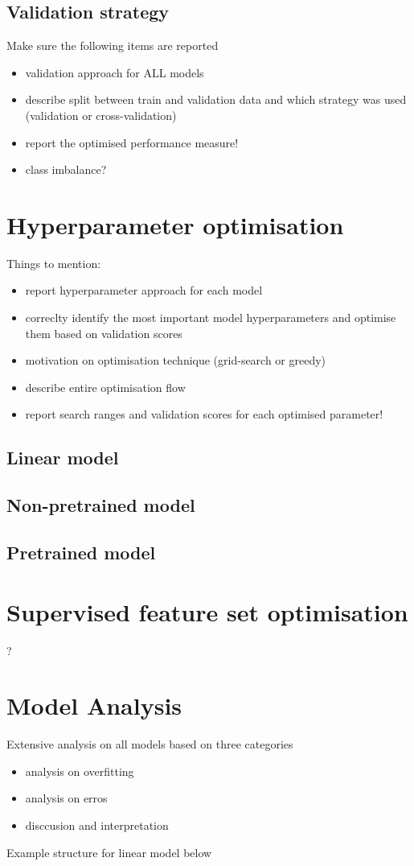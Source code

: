 \documentclass[8pt, a4]{article}
\begin{document}
	\subsection{Validation strategy}
	Make sure the following items are reported
	\begin{itemize}
		\item validation approach for ALL models
		\item describe split between train and validation data and which strategy was used (validation or cross-validation)
		\item report the optimised performance measure!
		\item class imbalance?
	\end{itemize}
	\section{Hyperparameter optimisation}
 	Things to mention:
 	\begin{itemize}
 		\item report hyperparameter approach for each model
 		\item correclty identify the most important model hyperparameters and optimise them based on validation scores
 		\item motivation on optimisation technique (grid-search or greedy)
 		\item describe entire optimisation flow
 		\item report search ranges and validation scores for each optimised parameter!
 	\end{itemize}

	\subsection{Linear model}
	\subsection{Non-pretrained model}
	\subsection{Pretrained model}
	
	
	\section{Supervised feature set optimisation}
	?
	
	\section{Model Analysis}
	Extensive analysis on all models based on three categories
	\begin{itemize}
		\item analysis on overfitting
		\item analysis on erros
		\item disccusion and interpretation
	\end{itemize}
	Example structure for linear model below
\end{document}
